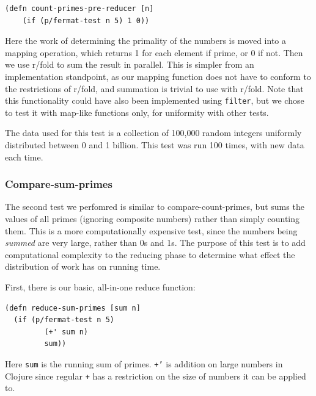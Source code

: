 \documentclass[12pt]{article}
\newcommand{\comment}[1]{{\bf \tt  {#1}}}
\newcommand{\emcomment}[1]{\textcolor{ForestGreen}{\comment{Elena: {#1}}}}
\newcommand{\joecomment}[1]{\textcolor{JoesGold}{\comment{Joe: {#1}}}}
\newcommand{\clocode}[1]{{\texttt {#1}}}
\begin{document}
\begin{verbatim}
(defn count-primes-pre-reducer [n] 
    (if (p/fermat-test n 5) 1 0))
\end{verbatim}

Here the work of determining the primality of the numbers is moved into a mapping operation, which returns 1 for each element if prime, or 0 if not. Then we use r/fold to sum the result in parallel. This is simpler from an implementation standpoint, as our mapping function does not have to conform to the restrictions of r/fold, and summation is trivial to use with r/fold. Note that this functionality could have also been implemented using \clocode{filter}, but we chose to test it with map-like functions only, for uniformity with other tests. 

The data used for this test is a collection of 100,000 random integers uniformly distributed between 0 and 1 billion. This test was run 100 times, with new data each time. 

  
\subsubsection{Compare-sum-primes}\label{sec:sum-primes}
The second test we perfomred is similar to compare-count-primes, but sums the values of all primes (ignoring composite numbers) rather than simply counting them. This is a more computationally expensive test, since the numbers being \emph{summed} are very large, rather than 0s and 1s. The purpose of this test is to add computational complexity to the %
reducing phase to determine what effect the distribution of work has on running time.

First, there is our basic, all-in-one reduce function:
\begin{verbatim}
(defn reduce-sum-primes [sum n]
  (if (p/fermat-test n 5)
         (+' sum n)
         sum))
\end{verbatim}
Here \clocode{sum} is the running sum of primes. \clocode{+'} is addition on large numbers in Clojure since regular \clocode{+} has a restriction on the size of numbers it can be applied to. 
\end{document}

